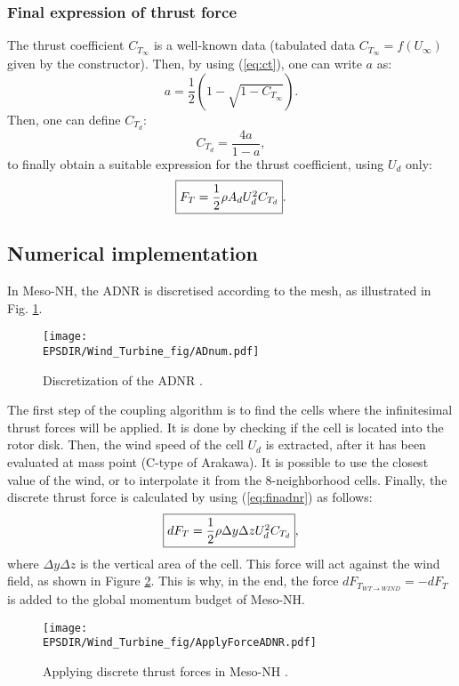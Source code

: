 		\subsubsection*{Final expression of thrust force}

The thrust coefficient $C_{T_\infty}$  is a well-known data (tabulated data $C_{T_\infty} = f(U_{\infty})$ given by the constructor). Then, by using  (\ref{eq:ct}), one can write $a$ as:
\begin{equation}
a = \dfrac{1}{2}(1-\sqrt{1-C_{T_\infty}}).
\end{equation}
Then, one can define $C_{T_d}$:
\begin{equation}	
C_{T_d} = \dfrac{4a}{1 -a},
\end{equation}	
to finally obtain a suitable expression for the thrust coefficient, using $U_d$ only:
\begin{equation}
\fbox{$
F_T = \dfrac{1}{2} \rho A_d U_d^2 C_{T_d}
$}.
\label{eq:finadnr}
\end{equation}  

\subsection{Numerical implementation}

In Meso-NH, the ADNR is discretised according to the mesh, as illustrated in Fig. \ref{fig:adnum}.
\begin{figure}[h]
\centering
\texttt{[image: \\EPSDIR/Wind\_Turbine\_fig/ADnum.pdf]}
\caption{Discretization of the ADNR \citet{joulin2019modelisation}.}
\label{fig:adnum}  
\end{figure}
\medbreak
The first step of the coupling algorithm is to find the cells where the infinitesimal thrust forces will be applied. It is done by checking if the cell is located into the rotor disk. Then, the wind speed of the cell $U_d$ is extracted, after it has been evaluated at mass point (C-type of Arakawa). It is possible to use the closest value of the wind, or to interpolate it from the 8-neighborhood cells. Finally, the discrete thrust force is calculated by using (\ref{eq:finadnr}) as follows:
\begin{equation}
\fbox{$
dF_T = \dfrac{1}{2} \rho \Delta y \Delta z U_d^2 C_{T_d}
$},
\label{eq:adnrft}
\end{equation}
where $\Delta y \Delta z$ is the vertical area of the cell. This force will act against the wind field, as shown in Figure \ref{fig:appluforceadnr}. This is why, in the end, the force $dF_{T_{WT\rightarrow WIND}} = -dF_T$ is added to the global momentum budget of Meso-NH. 
\begin{figure}[h]
\centering
\texttt{[image: \\EPSDIR/Wind\_Turbine\_fig/ApplyForceADNR.pdf]}
\caption{Applying discrete thrust forces in Meso-NH \citet{joulin2019modelisation}.}
\label{fig:appluforceadnr}  
\end{figure}

